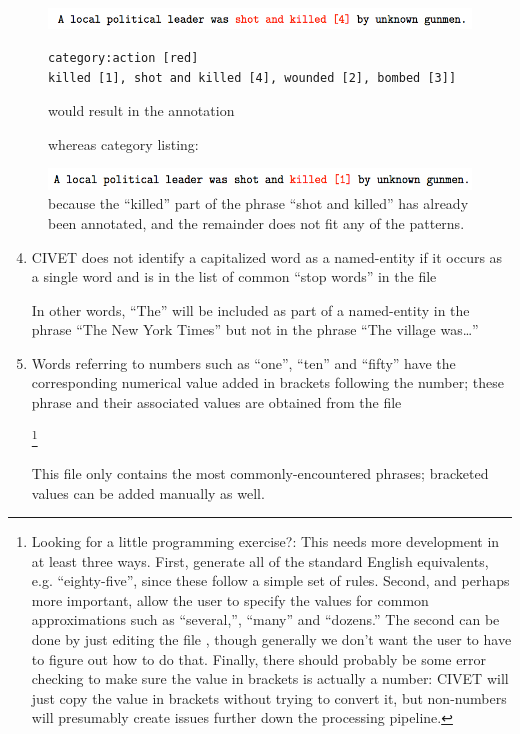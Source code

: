 \documentclass[letterpaper,10pt,english]{sphinxmanual}
\begin{document}
\begin{figure}[htbp]
\centering
\capstart

\includegraphics{annotation1.png}
\caption{whereas category listing:}{\small 
\begin{Verbatim}[commandchars=\\\{\}]
category:action [red]
killed [1], shot and killed [4], wounded [2], bombed [3]]
\end{Verbatim}

would result in the annotation
}\end{figure}
\begin{figure}[htbp]
\centering
\capstart

\includegraphics{annotation2.png}
\caption{because the “killed” part of the phrase “shot and killed” has
already been annotated, and the remainder does not fit any of the
patterns.}\end{figure}
\begin{enumerate}
\setcounter{enumi}{3}
\item {} 
CIVET does not identify a capitalized word as a named-entity if it occurs as a single
word and is in the list of common “stop words” in the file
\begin{quote}

\end{quote}

In other words, “The” will be included as part of a named-entity in the phrase
“The New York Times” but not in the phrase “The village was…”

\item {} 
Words referring to numbers such as “one”, “ten” and “fifty” have the corresponding
numerical value added in brackets following the number; these phrase and their
associated values are obtained from the file

 \footnote{
Looking for a little programming exercise?: This needs more
development in at least three ways. First, generate all of the
standard English equivalents, e.g. “eighty-five”, since these follow
a simple set of rules. Second, and perhaps more important, allow the
user to specify the values for common approximations such as
“several,”, “many” and “dozens.” The second can be done by just
editing the file , though generally we don’t
want the user to have to figure out how to do that. Finally, there
should probably be some error checking to make sure the value in
brackets is actually a number: CIVET will just copy the value in
brackets without trying to convert it, but non-numbers will
presumably create issues further down the processing pipeline.
}

This file only contains the most commonly-encountered phrases; bracketed values can be added manually as well.

\end{enumerate}
\end{document}
